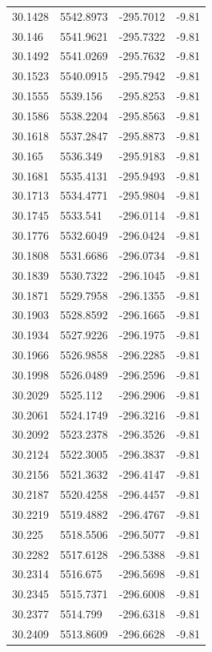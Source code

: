 \begin{table}[H]
\begin{tabular}{llll}
30.1428 & 5542.8973 & -295.7012 & -9.81 \\
30.146 & 5541.9621 & -295.7322 & -9.81 \\
30.1492 & 5541.0269 & -295.7632 & -9.81 \\
30.1523 & 5540.0915 & -295.7942 & -9.81 \\
30.1555 & 5539.156 & -295.8253 & -9.81 \\
30.1586 & 5538.2204 & -295.8563 & -9.81 \\
30.1618 & 5537.2847 & -295.8873 & -9.81 \\
30.165 & 5536.349 & -295.9183 & -9.81 \\
30.1681 & 5535.4131 & -295.9493 & -9.81 \\
30.1713 & 5534.4771 & -295.9804 & -9.81 \\
30.1745 & 5533.541 & -296.0114 & -9.81 \\
30.1776 & 5532.6049 & -296.0424 & -9.81 \\
30.1808 & 5531.6686 & -296.0734 & -9.81 \\
30.1839 & 5530.7322 & -296.1045 & -9.81 \\
30.1871 & 5529.7958 & -296.1355 & -9.81 \\
30.1903 & 5528.8592 & -296.1665 & -9.81 \\
30.1934 & 5527.9226 & -296.1975 & -9.81 \\
30.1966 & 5526.9858 & -296.2285 & -9.81 \\
30.1998 & 5526.0489 & -296.2596 & -9.81 \\
30.2029 & 5525.112 & -296.2906 & -9.81 \\
30.2061 & 5524.1749 & -296.3216 & -9.81 \\
30.2092 & 5523.2378 & -296.3526 & -9.81 \\
30.2124 & 5522.3005 & -296.3837 & -9.81 \\
30.2156 & 5521.3632 & -296.4147 & -9.81 \\
30.2187 & 5520.4258 & -296.4457 & -9.81 \\
30.2219 & 5519.4882 & -296.4767 & -9.81 \\
30.225 & 5518.5506 & -296.5077 & -9.81 \\
30.2282 & 5517.6128 & -296.5388 & -9.81 \\
30.2314 & 5516.675 & -296.5698 & -9.81 \\
30.2345 & 5515.7371 & -296.6008 & -9.81 \\
30.2377 & 5514.799 & -296.6318 & -9.81 \\
30.2409 & 5513.8609 & -296.6628 & -9.81 \\

\end{tabular}
\end{table}
